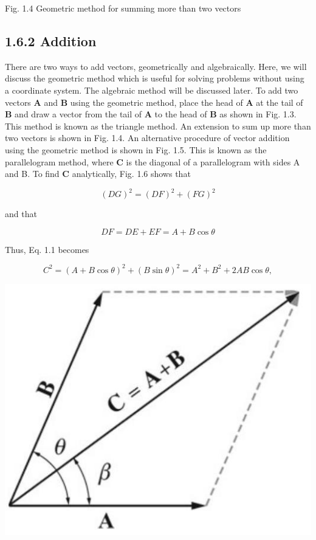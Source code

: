 \documentclass[10pt]{article}
\begin{document}
Fig. 1.4 Geometric method for summing more than two vectors

\subsection*{1.6.2 Addition}
There are two ways to add vectors, geometrically and algebraically. Here, we will discuss the geometric method which is useful for solving problems without using a coordinate system. The algebraic method will be discussed later. To add two vectors $\mathbf{A}$ and $\mathbf{B}$ using the geometric method, place the head of $\mathbf{A}$ at the tail of $\mathbf{B}$ and draw a vector from the tail of $\mathbf{A}$ to the head of $\mathbf{B}$ as shown in Fig. 1.3. This method is known as the triangle method. An extension to sum up more than two vectors is shown in Fig. 1.4. An alternative procedure of vector addition using the geometric method is shown in Fig. 1.5. This is known as the parallelogram method, where $\mathbf{C}$ is the diagonal of a parallelogram with sides A and B. To find $\mathbf{C}$ analytically, Fig. 1.6 shows that


\begin{equation*}
(D G)^{2}=(D F)^{2}+(F G)^{2} \tag{1.1}
\end{equation*}


and that

$$
D F=D E+E F=A+B \cos \theta
$$

Thus, Eq. 1.1 becomes

$$
C^{2}=(A+B \cos \theta)^{2}+(B \sin \theta)^{2}=A^{2}+B^{2}+2 A B \cos \theta,
$$

\begin{center}
\includegraphics[max width=\textwidth]{2024_09_13_db1f357d2aad0a03eb2eg-015(3)}
\end{center}
\end{document}
